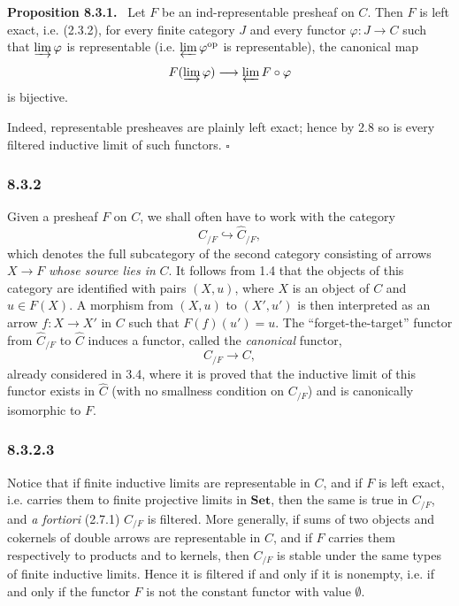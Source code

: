 \documentclass[11pt]{article}
\newcommand{\Set}{\mathbf{Set}}
\newcommand{\op}{\mathrm{op}}
\newcommand{\qedtext}{\hfill\(\square\)}
\newenvironment{statement}[1]{\par\medskip\noindent\textbf{#1.}\ }{\par\medskip}
\begin{document}
\begin{statement}{Proposition 8.3.1}
Let $F$ be an ind-representable presheaf on $C$. Then $F$ is left exact, i.e. (2.3.2), for every finite category $J$ and every functor $\varphi:J\to C$ such that $\varinjlim\varphi$ is representable (i.e. $\varprojlim\varphi^{\op}$ is representable), the canonical map
\[
F(\varinjlim\varphi)\longrightarrow\varprojlim F\circ\varphi
\]
is bijective.
\end{statement}

Indeed, representable presheaves are plainly left exact; hence by 2.8 so is every filtered inductive limit of such functors. \qedtext

\subsubsection*{8.3.2}
Given a presheaf $F$ on $C$, we shall often have to work with the category
\[
C_{/F}\hookrightarrow\widehat C_{/F},
\tag{8.3.2.1}
\]
which denotes the full subcategory of the second category consisting of arrows $X\to F$ \emph{whose source lies in} $C$. It follows from 1.4 that the objects of this category are identified with pairs $(X,u)$, where $X$ is an object of $C$ and $u\in F(X)$. A morphism from $(X,u)$ to $(X',u')$ is then interpreted as an arrow $f:X\to X'$ in $C$ such that $F(f)(u')=u$. The ``forget-the-target'' functor from $\widehat C_{/F}$ to $\widehat C$ induces a functor, called the \emph{canonical} functor,
\[
C_{/F}\longrightarrow C,
\tag{8.3.2.2}
\]
already considered in 3.4, where it is proved that the inductive limit of this functor exists in $\widehat C$ (with no smallness condition on $C_{/F}$) and is canonically isomorphic to $F$.

\subsubsection*{8.3.2.3}
Notice that if finite inductive limits are representable in $C$, and if $F$ is left exact, i.e. carries them to finite projective limits in $\Set$, then the same is true in $C_{/F}$, and \emph{a fortiori} (2.7.1) $C_{/F}$ is filtered. More generally, if sums of two objects and cokernels of double arrows are representable in $C$, and if $F$ carries them respectively to products and to kernels, then $C_{/F}$ is stable under the same types of finite inductive limits. Hence it is filtered if and only if it is nonempty, i.e. if and only if the functor $F$ is not the constant functor with value $\emptyset$.
\end{document}
